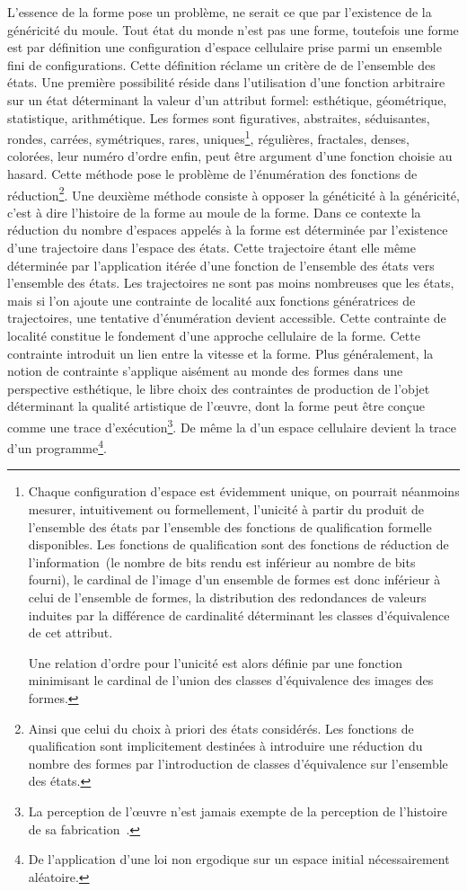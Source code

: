 L'essence de la forme pose un problème, ne serait ce que
par l'existence de la généricité du moule. %
Tout état du monde n'est pas une forme, toutefois une forme est par
définition une configuration d'espace cellulaire prise parmi un
ensemble fini de configurations. %
Cette définition réclame un critère de
 de l'ensemble des états. %
Une première possibilité réside dans l'utilisation d'une fonction
arbitraire sur un état déterminant la valeur d'un attribut formel:
esthétique, géométrique, sta\-tistique, arithmétique. %
Les formes sont figuratives, abstraites, séduisantes, rondes, carrées,
symétriques, rares, uniques\footnote{%
  Chaque configuration d'espace est évidemment unique, on pourrait
  néanmoins mesurer, intuitivement ou formellement, l'unicité à partir
  du produit de l'ensemble des états par l'ensemble des
  fonctions de qualification formelle disponibles. %
  Les fonctions de qualification sont des fonctions de réduction de
  l'information~(le nombre de bits rendu est inférieur au nombre de
  bits fourni), le cardinal de l'image d'un ensemble de formes est
  donc inférieur à celui de l'ensemble de formes, la distribution des
  redondances de valeurs induites par la différence de cardinalité
  déterminant les classes d'équivalence de cet attribut. %
  
  Une relation d'ordre pour l'unicité est alors définie par une
  fonction minimisant le cardinal de l'union des classes d'équivalence
  des images des formes.}, %
régulières, fractales, denses, colorées, leur numéro d'ordre enfin,
peut être argument d'une fonction choisie au hasard. %
Cette méthode pose le problème de l'énumération des fonctions de
réduction\footnote{%
  Ainsi que celui du choix à priori des états considérés. %
  Les fonctions de qualification sont implicitement destinées à
  introduire une réduction du nombre des formes par l'introduction de
  classes d'équivalence sur l'ensemble des états.}. %
Une deuxième méthode consiste à opposer la généticité à la
généricité, c'est à dire l'histoire de la forme au moule de la forme. %
Dans ce contexte la réduction du nombre d'espaces appelés à la forme
est déterminée par l'existence d'une trajectoire dans l'espace des
états. %
Cette trajectoire étant elle même déterminée par l'application itérée
d'une fonction de l'ensemble des états vers l'ensemble des états. %
Les trajectoires ne sont pas moins nombreuses que les états, mais si
l'on ajoute une contrainte de localité aux fonctions génératrices de
trajectoires, une tentative d'énumération devient accessible. %
Cette contrainte de localité constitue le fondement d'une approche
cellulaire de la forme. %
Cette contrainte introduit un lien entre la vitesse et la forme. %
Plus généralement, la notion de contrainte s'applique aisément au
monde des formes dans une perspective esthétique, le libre choix des
contraintes de production de l'objet déterminant la qualité artistique
de l'œuvre, dont la forme peut être conçue comme une trace
d'exécution\footnote{%
  La perception de l'œuvre n'est jamais exempte de la perception
  de l'histoire de sa fabrication~\cite[]{Gombrich71}.}. %
De même la  d'un espace cellulaire
devient la trace d'un programme\footnote{%
  De l'application d'une loi non ergodique sur un espace initial
  nécessairement aléatoire.}. %

